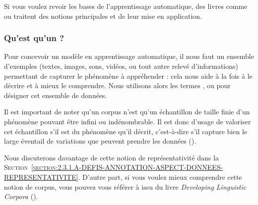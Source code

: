 			\begin{leftBarInformation}
				Si vous voulez revoir les bases de l'apprentissage automatique, des livres comme \cite{zhou:2021:machine-learning} ou \cite{raschka-mirjalili:2019:python-machine-learning} traitent des notions principales et de leur mise en application.
			\end{leftBarInformation}
			
		\subsubsection{Qu'est qu'un \textguillemets{\texttt{corpus d'entraînement}} ?}
		\label{section:2.1.1.B-PRESENTATION-ANNOTATION-DEFINITION-BASE-APPRENTISSAGE}

			Pour concevoir un modèle en apprentissage automatique, il nous faut un ensemble d'exemples (textes, images, sons, vidéos, ou tout autre relevé d'informations) permettant de capturer le phénomène à appréhender : cela nous aide à la fois à le décrire et à mieux le comprendre.
			Nous utilisons alors les termes ,  ou  pour désigner cet ensemble de données.
			
			Il est important de noter qu'un corpus n'est qu'un échantillon de taille finie d'un phénomène pouvant être infini ou indénombrable.
			Il est donc d'usage de valoriser cet échantillon s'il est  du phénomène qu'il décrit, c'est-à-dire s'il capture bien le large éventail de variations que peuvent prendre les données (\cite{biber:1993:representativeness-corpus-design}).
			
			\begin{leftBarInformation}
				Nous discuterons davantage de cette notion de représentativité dans la \textsc{Section~\ref{section:2.3.1.A-DEFIS-ANNOTATION-ASPECT-DONNEES-REPRESENTATIVITE}}.
				D'autre part, si vous voulez mieux comprendre cette notion de corpus, vous pouvez vous référer à \cite{sinclair:2004:corpus-text-basic} issu du livre \textit{Developing Linguistic Corpora} (\cite{wynne:2004:developing-linguistic-corpora}).
			\end{leftBarInformation}
		
